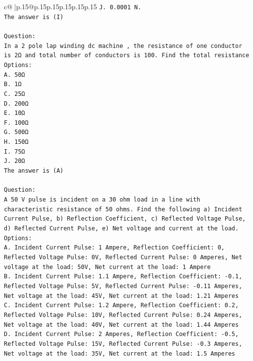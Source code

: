 \documentclass{article}
\begin{document}
{\begin{supertabular}{c@{$\;$}|p{.15\linewidth}@{}p{.15\linewidth}p{.15\linewidth}p{.15\linewidth}p{.15\linewidth}p{.15\linewidth}}
{{{\texttt{J. 0.0001 N.} \\
\texttt{The answer is (I)} \\
\\ 
\texttt{Question:} \\
\texttt{In a 2 pole lap winding dc machine , the resistance of one conductor is 2Ω and total number of conductors is 100. Find the total resistance} \\
\texttt{Options:} \\
\texttt{A. 50Ω} \\
\texttt{B. 1Ω} \\
\texttt{C. 25Ω} \\
\texttt{D. 200Ω} \\
\texttt{E. 10Ω} \\
\texttt{F. 100Ω} \\
\texttt{G. 500Ω} \\
\texttt{H. 150Ω} \\
\texttt{I. 75Ω} \\
\texttt{J. 20Ω} \\
\texttt{The answer is (A)} \\
\\ 
\texttt{Question:} \\
\texttt{A 50 V pulse is incident on a 30 ohm load in a line with characteristic resistance of 50 ohms. Find the following a) Incident Current Pulse, b) Reflection Coefficient, c) Reflected Voltage Pulse, d) Reflected Current Pulse, e) Net voltage and current at the load.} \\
\texttt{Options:} \\
\texttt{A. Incident Current Pulse: 1 Ampere, Reflection Coefficient: 0, Reflected Voltage Pulse: 0V, Reflected Current Pulse: 0 Amperes, Net voltage at the load: 50V, Net current at the load: 1 Ampere} \\
\texttt{B. Incident Current Pulse: 1.1 Ampere, Reflection Coefficient: {-}0.1, Reflected Voltage Pulse: 5V, Reflected Current Pulse: {-}0.11 Amperes, Net voltage at the load: 45V, Net current at the load: 1.21 Amperes} \\
\texttt{C. Incident Current Pulse: 1.2 Ampere, Reflection Coefficient: 0.2, Reflected Voltage Pulse: 10V, Reflected Current Pulse: 0.24 Amperes, Net voltage at the load: 40V, Net current at the load: 1.44 Amperes} \\
\texttt{D. Incident Current Pulse: 2 Amperes, Reflection Coefficient: {-}0.5, Reflected Voltage Pulse: 15V, Reflected Current Pulse: {-}0.3 Amperes, Net voltage at the load: 35V, Net current at the load: 1.5 Amperes} \\
}}}
\end{supertabular}}
\end{document}
